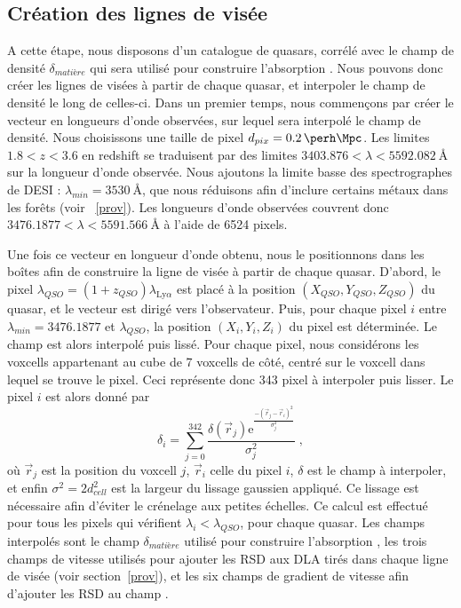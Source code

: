 \documentclass[11pt, twoside, a4paper, openright]{report}
\begin{document}
\subsection{Création des lignes de visée}
A cette étape, nous disposons d'un catalogue de quasars, corrélé avec le champ de densité $\delta_{matière}$ qui sera utilisé pour construire l'absorption \lya{}. Nous pouvons donc créer les lignes de visées à partir de chaque quasar, et interpoler le champ de densité le long de celles-ci.
Dans un premier temps, nous commençons par créer le vecteur en longueurs d'onde observées, sur lequel sera interpolé le champ de densité. Nous choisissons une taille de pixel $d_{pix} = \SI{0.2}{\perh\Mpc}$. Les limites $\num{1.8} < z < \num{3.6}$ en redshift se traduisent par des limites $\num{3403.876} < \lambda < \SI{5592.082}{\angstrom}$ sur la longueur d'onde observée. Nous ajoutons la limite basse des spectrographes de DESI : $\lambda_{min} = \SI{3530}{\angstrom}$, que nous réduisons afin d'inclure certains métaux dans les forêts (voir ~\ref{prov}). Les longueurs d'onde observées couvrent donc $\num{3476.1877} < \lambda < \SI{5591.566}{\angstrom}$ à l'aide de \num{6524} pixels.

Une fois ce vecteur en longueur d'onde obtenu, nous le positionnons dans les boîtes afin de construire la ligne de visée à partir de chaque quasar.
D'abord, le pixel $\lambda_{QSO} = (1+z_{QSO}) \lambda_{\mathrm{Ly}\alpha}$ est placé à la position $(X_{QSO}, Y_{QSO}, Z_{QSO})$ du quasar, et le vecteur est dirigé vers l'observateur. Puis, pour chaque pixel $i$ entre $\lambda_{min} = \num{3476.1877}$ et $\lambda_{QSO}$, la position $(X_i, Y_i, Z_i)$ du pixel est déterminée.
Le champ est alors interpolé puis lissé. Pour chaque pixel, nous considérons les voxcells appartenant au cube de 7 voxcells de côté, centré sur le voxcell dans lequel se trouve le pixel. Ceci représente donc \num{343} pixel à interpoler puis lisser.
Le pixel $i$ est alors donné par
\begin{equation}
  \delta_i = \sum_{j=0}^{342}  \frac{\delta(\vec r_j) \mathrm{e}^{\frac{-(\vec r_j - \vec r_i)^2 }{ \sigma_j^2}}}{\sigma_j^2} \; ,
\end{equation}
où $\vec r_j$ est la position du voxcell $j$, $\vec r_i$ celle du pixel $i$, $\delta$ est le champ à interpoler, et enfin $\sigma^2 = 2 d_{cell}^2$ est la largeur du lissage gaussien appliqué. Ce lissage est nécessaire afin d'éviter le crénelage aux petites échelles.
Ce calcul est effectué pour tous les pixels qui vérifient $\lambda_i < \lambda_{QSO}$, pour chaque quasar. Les champs interpolés sont le champ $\delta_{matière}$ utilisé pour construire l'absorption \lya{}, les trois champs de vitesse utilisés pour ajouter les RSD aux DLA tirés dans chaque ligne de visée (voir section~\ref{prov}), et les six champs de gradient de vitesse afin d'ajouter les RSD au champ \lya{}.
\end{document}
